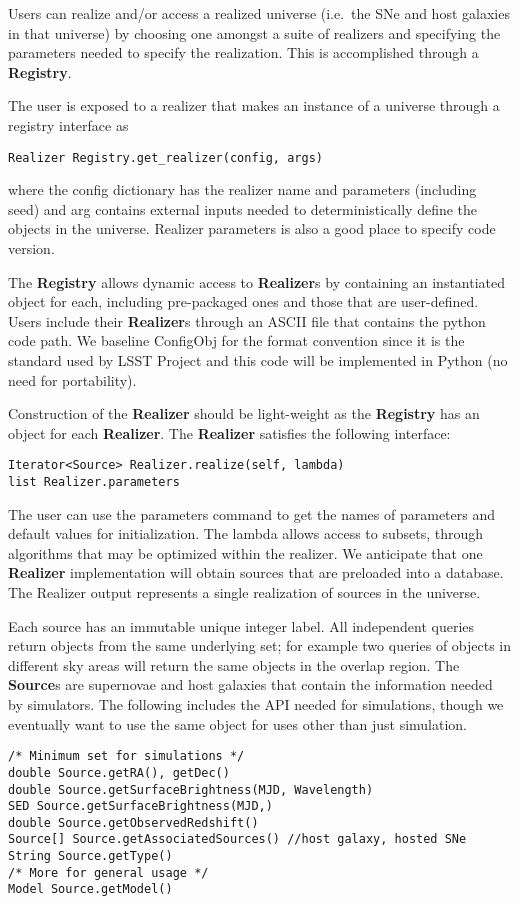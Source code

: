 \documentclass[preprint]{aastex}
\begin{document}
Users can realize and/or access a realized
universe (i.e.\ the SNe and host galaxies in that
universe) by choosing one amongst a suite of realizers and specifying
the parameters needed to specify the realization.  This is accomplished through a
{\bf Registry}.

The user is exposed to a realizer that makes an instance of a universe through a registry interface as
\begin{verbatim}
Realizer Registry.get_realizer(config, args)
\end{verbatim}
where the config dictionary has the realizer name and parameters (including seed) and arg
contains external inputs needed
to deterministically define the objects in the universe.   Realizer parameters is also
a good place to specify code version.

The {\bf Registry} allows dynamic access to  {\bf Realizer}s by containing
an instantiated object for each, including 
pre-packaged ones and those that are user-defined.  Users include their {\bf Realizer}s
through
an  ASCII file that contains the 
python code path.
We baseline ConfigObj for the format convention since it is the standard used by
LSST Project and
this code will be implemented in Python (no need for portability).

Construction of the {\bf Realizer} should be light-weight as
the {\bf Registry} has an object for each  {\bf Realizer}.
The {\bf Realizer} satisfies the following interface:
\begin{verbatim}
Iterator<Source> Realizer.realize(self, lambda)
list Realizer.parameters
\end{verbatim}
The user can use the parameters command to get the names of parameters and
default values for initialization.  The lambda allows access to subsets, through
algorithms that may be optimized within the realizer.  We anticipate that one {\bf Realizer} implementation
will obtain sources that are preloaded into a database.
The Realizer output represents a single realization of sources in the universe.

Each source has an immutable unique integer label.
All independent queries return objects from the same underlying set; for example two
queries of objects in different sky areas will return the same objects in the overlap
region. 
The {\bf Source}s are supernovae and host galaxies that contain the information
needed by simulators.  
The following includes the API needed for simulations, though we
eventually want to use the same object for uses other than just simulation.
\begin{verbatim}
/* Minimum set for simulations */
double Source.getRA(), getDec()
double Source.getSurfaceBrightness(MJD, Wavelength)
SED Source.getSurfaceBrightness(MJD,)
double Source.getObservedRedshift()
Source[] Source.getAssociatedSources() //host galaxy, hosted SNe
String Source.getType()
/* More for general usage */
Model Source.getModel()
\end{verbatim}
\end{document}
